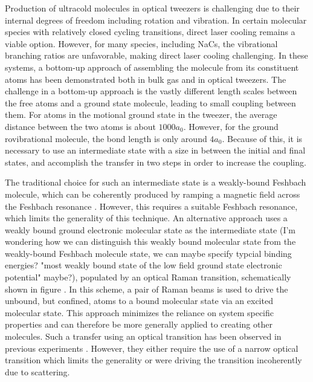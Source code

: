 \documentclass[aps,prl,twocolumn,groupedaddress]{revtex4-1}
\newcommand{\todo}[1]{}
\begin{document}
Production of ultracold molecules in optical tweezers is challenging due to their internal degrees of freedom including rotation and vibration. In certain molecular species with relatively closed cycling transitions, direct laser cooling remains a viable option. However, for many species, including NaCs, the vibrational branching ratios are unfavorable, making direct laser cooling challenging. In these systems, a bottom-up approach of assembling the molecule from its constituent atoms has been demonstrated both in bulk gas and in optical tweezers. The challenge in a bottom-up approach is the vastly different length scales between the free atoms and a ground state molecule, leading to small coupling between them. For atoms in the motional ground state in the tweezer,
the average distance between the two atoms is about $1000a_0$.
However, for the ground rovibrational molecule, the bond length is only around $4a_0$. Because of this, it is necessary to use an intermediate state
with a size in between the initial and final states,
and accomplish the transfer in two steps in order to increase the coupling.

The traditional choice for such an intermediate state is a weakly-bound Feshbach molecule, which can be coherently produced by ramping a magnetic field across the Feshbach resonance \todo{cite our FB result}. However, this requires a suitable Feshbach resonance, which limits the generality of this technique. An alternative approach uses a weakly bound ground electronic molecular state as the intermediate state (I'm wondering how we can distinguish this weakly bound molecular state from the weakly-bound Feshbach molecule state, we can maybe specify typcial binding energies? "most weakly bound state of the low field ground state electronic potential" maybe?), populated by an optical Raman transition, schematically shown in figure \todo{}. In this scheme, a pair of Raman beams is used to drive the unbound, but confined, atoms to a bound molecular state via an excited molecular state. This approach minimizes the reliance on system specific properties
and can therefore be more generally applied to creating other molecules. Such a transfer using an optical transition has been observed in previous experiments \todo{cite}.
However, they either require the use of a narrow optical transition which limits the generality
or were driving the transition incoherently due to scattering.

\end{document}
